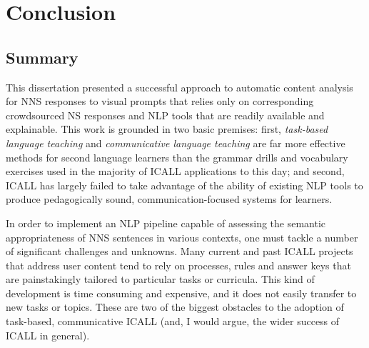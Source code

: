 \chapter{Conclusion}
\label{chap:conclusion}

\section{Summary}
\label{sec:conclusion-summary}


This dissertation presented a successful approach to automatic content analysis for NNS responses to visual prompts that relies only on corresponding crowdsourced NS responses and NLP tools that are readily available and explainable. This work is grounded in two basic premises: first, \textit{task-based language teaching} and \textit{communicative language teaching} are far more effective methods for second language learners than the grammar drills and vocabulary exercises used in the majority of ICALL applications to this day; and second, ICALL has largely failed to take advantage of the ability of existing NLP tools to produce pedagogically sound, communication-focused systems for learners. 

In order to implement an NLP pipeline capable of assessing the semantic appropriateness of NNS sentences in various contexts, one must tackle a number of significant challenges and unknowns. Many current and past ICALL projects that address user content tend to rely on processes, rules and answer keys that are painstakingly tailored to particular tasks or curricula. This kind of development is time consuming and expensive, and it does not easily transfer to new tasks or topics. These are two of the biggest obstacles to the adoption of task-based, communicative ICALL (and, I would argue, the wider success of ICALL in general). 

